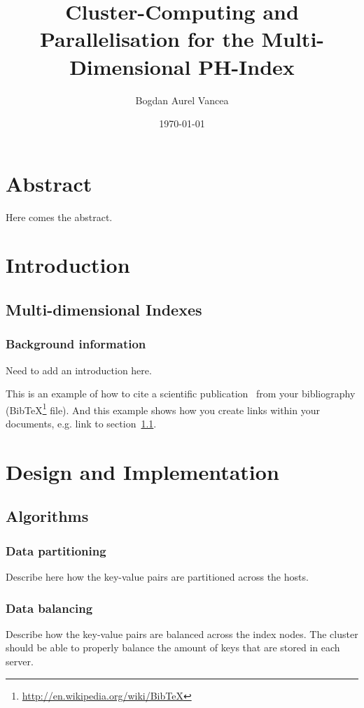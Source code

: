 \documentclass[11pt,a4paper]{globis-book}
\title{Cluster-Computing and Parallelisation for the
Multi-Dimensional PH-Index}
\author{Bogdan Aurel Vancea}
\institute{Institute of Information Systems}
\date{\today}
\begin{document}
\frontmatter
\maketitlepage
\cleardoublepage
{}

\chapter*{Abstract}

Here comes the abstract.

\tableofcontents

\mainmatter


\chapter{Introduction}
\section{Multi-dimensional Indexes}
\label{sec:title}

\subsection{Background information}
Need to add an introduction here.

This is an example of how to cite a scientific publication~\cite{murolo2013} from your bibliography (BibTeX\footnote{\url{http://en.wikipedia.org/wiki/BibTeX}} file). And this example shows how you create links within your documents, e.g. link to section~\ref{sec:title}.

\chapter{Design and Implementation}
\section{Algorithms}
\subsection{Data partitioning}

Describe here how the key-value pairs are partitioned across the hosts.
\subsection{Data balancing}

Describe how the key-value pairs are balanced across the index nodes.
The cluster should be able to properly balance the amount of keys that are stored in each server.
\end{document}
